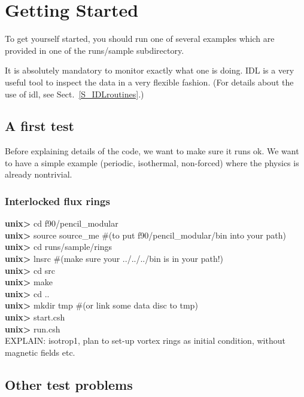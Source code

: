 \documentclass[12pt,twoside,notitlepage,a4paper]{article}
\newcommand{\prompt}[1]{{\ttfamily\bfseries{}#1}}
\begin{document}

\section{Getting Started}

To get yourself started, you should run one of several examples which are
provided in one of the runs/sample subdirectory.

It is absolutely mandatory to monitor exactly what one is doing.
IDL is a very useful tool to inspect the data in a very flexible fashion.
(For details about the use of idl, see Sect.~\ref{S_IDLroutines}.)

\subsection{A first test}

Before explaining details of the code, we want to make sure it runs ok.
We want to have a simple example (periodic, isothermal, non-forced)
where the physics is already nontrivial.

\subsubsection{Interlocked flux rings}

\prompt{unix> } cd f90/pencil\_modular\\
\prompt{unix> } source source\_me \quad\#(to put f90/pencil\_modular/bin into your path)\\
\prompt{unix> } cd runs/sample/rings\\
\prompt{unix> } lnsrc \quad\#(make sure your ../../../bin is in your path!)\\
\prompt{unix> } cd src\\
\prompt{unix> } make\\
\prompt{unix> } cd ..\\
\prompt{unix> } mkdir tmp \quad\#(or link some data disc to tmp)\\
\prompt{unix> } start.csh\\
\prompt{unix> } run.csh\\

EXPLAIN: isotrop1, plan to set-up vortex rings as initial condition,
without magnetic fields etc.

\subsection{Other test problems}
\end{document}
